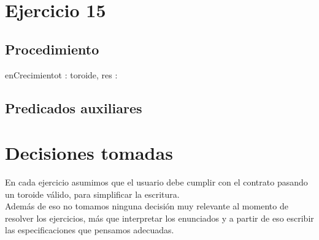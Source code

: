 \documentclass[a4paper]{article}
\begin{document}
\section{Ejercicio 15}

\subsection{Procedimiento}
\begin{proc}{enCrecimiento}{\In t : toroide, \Out res : \bool}{}
\end{proc}

\subsection{Predicados auxiliares}

\section{Decisiones tomadas}
En cada ejercicio asumimos que el usuario debe cumplir con el contrato pasando un toroide válido, para simplificar la escritura.\\ 
\indent Además de eso no tomamos ninguna decisión muy relevante al momento de resolver los ejercicios, más que interpretar los enunciados y a partir de eso escribir las especificaciones que pensamos adecuadas.
\end{document}
